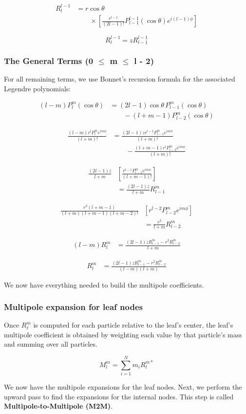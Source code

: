 \[
\begin{aligned}
R_l^{l-1}
&=r\cos\theta\\
&\qquad\times\left[\frac{r^{l-1}}{(2l-1)!}
P_{l-1}^{l-1}(\cos\theta)e^{i(l-1)\phi}\right]
\end{aligned}
\]

\[
R_l^{l-1}=zR_{l-1}^{l-1}
\]

\subsubsection{The General Terms (0 $\leq$ m $\leq$ l - 2)}

For all remaining terms, we use Bonnet's recursion formula for the associated Legendre polynomials:

\[
\begin{aligned}
(l-m)P_l^m(\cos\theta)
&=(2l-1)\cos\theta\,P_{l-1}^m(\cos\theta)\\
&\qquad-(l+m-1)P_{l-2}^m(\cos\theta)
\end{aligned}
\]

\[
\begin{aligned}
\frac{(l-m)r^lP_l^m e^{im\phi}}{(l+m)!}
&=\frac{(2l-1)zr^{l-1}P_{l-1}^m e^{im\phi}}{(l+m)!}\\
&\qquad-\frac{(l+m-1)r^lP_{l-2}^m e^{im\phi}}{(l+m)!}
\end{aligned}
\]

\[
\begin{aligned}
\frac{(2l-1)z}{l+m}
&\left[\frac{r^{l-1}P_{l-1}^m e^{im\phi}}{(l+m-1)!}\right]\\
&=\frac{(2l-1)z}{l+m}R_{l-1}^m
\end{aligned}
\]

\[
\begin{aligned}
\frac{r^2(l+m-1)}{(l+m)(l+m-1)(l+m-2)!}
&\left[r^{l-2}P_{l-2}^m e^{im\phi}\right]\\
&=\frac{r^2}{l+m}R_{l-2}^m
\end{aligned}
\]

\[
\begin{aligned}
(l-m)R_l^m
&=\frac{(2l-1)zR_{l-1}^m-r^2R_{l-2}^m}{l+m}
\end{aligned}
\]

\[
\begin{aligned}
R_l^m
&=\frac{(2l-1)zR_{l-1}^m-r^2R_{l-2}^m}{(l-m)(l+m)}
\end{aligned}
\]

We now have everything needed to build the multipole coefficients.

\subsubsection{Multipole expansion for leaf nodes}
Once \(R_\ell^m\) is computed for each particle relative to the leaf’s center, the leaf’s multipole coefficient is obtained by weighting each value by that particle’s mass and summing over all particles.

\[
M_{l}^{m}
=
\sum_{i=1}^{N}
m_{i}
R_{l}^{m*}
\]

We now have the multipole expansions for the leaf nodes. Next, we perform the upward pass to find the expansions for the internal nodes. This step is called \textbf{Multipole-to-Multipole (M2M)}.